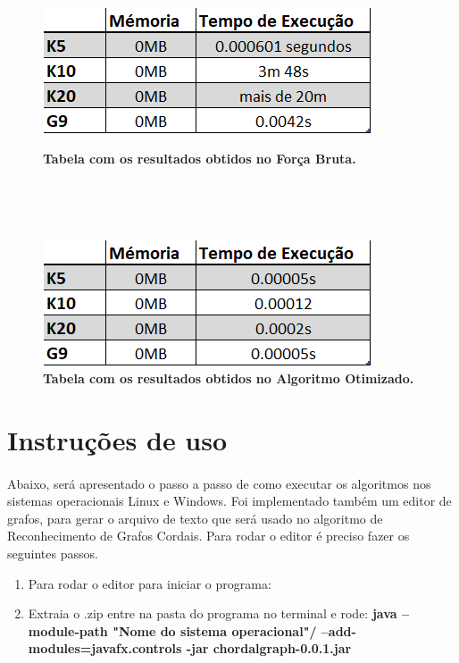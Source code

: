 \documentclass[a4paper, 11pt]{article}
\begin{document}
				\begin{figure}[H]
					\centering
					\includegraphics[scale=1]{tabela1.png}
					\caption{\textbf{Tabela com os resultados obtidos no Força Bruta.}}
					
					\ 
					
					\
					
					\includegraphics[scale=1]{tabela2.png}
					\centering
					\caption{\textbf{Tabela com os resultados obtidos no Algoritmo Otimizado.}}
				\end{figure}
				
				
		\section{Instruções de uso}
			\paragraph{}Abaixo, será apresentado o passo a passo de como executar os algoritmos nos sistemas operacionais Linux e Windows. Foi implementado também um editor de grafos, para gerar o arquivo de texto que será usado no algoritmo de Reconhecimento de Grafos Cordais. Para rodar o editor é preciso fazer os seguintes passos.
			
			\begin{enumerate}
				\item Para rodar o editor para iniciar o programa:
				\item Extraia o .zip entre na pasta do programa no terminal e rode:
				\textbf{java --module-path "Nome do sistema operacional"/ --add-modules=javafx.controls -jar chordalgraph-0.0.1.jar}
			\end{enumerate}
			
\end{document}
